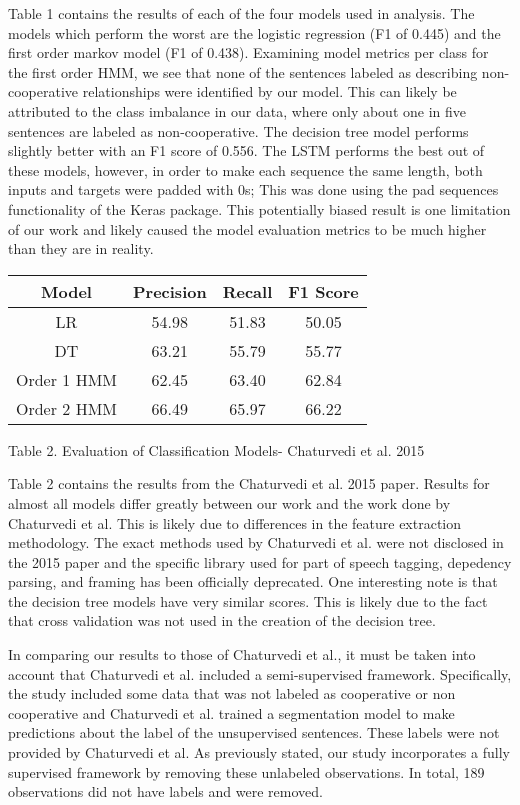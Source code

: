 \documentclass[11pt,a4paper]{article}
\begin{document}
Table 1 contains the results of each of the four models used in analysis. The models which perform the worst are the logistic regression (F1 of 0.445) and the first order markov model (F1 of 0.438). Examining model metrics per class for the first order HMM, we see that none of the sentences labeled as describing non-cooperative relationships were identified by our model. This can likely be attributed to the class imbalance in our data, where only about one in five sentences are labeled as non-cooperative. The decision tree model performs slightly better with an F1 score of 0.556. The LSTM performs the best out of these models, however, in order to make each sequence the same length, both inputs and targets were padded with 0s; This was done using the pad sequences functionality of the Keras package. This potentially biased result is one limitation of our work and likely caused the model evaluation metrics to be much higher than they are in reality. 

\begin{center}
 \begin{tabular}{||c c c c||} 
 \hline
 Model & Precision & Recall & F1 Score \\ [0.5ex] 
 \hline\hline
 LR & 54.98 & 51.83 & 50.05 \\ 
 \hline
 DT & 63.21 & 55.79 & 55.77 \\
 \hline
 Order 1 HMM & 62.45 & 63.40 & 62.84 \\
  \hline
 Order 2 HMM & 66.49 & 65.97 & 66.22 \\
 \hline
\end{tabular}
\end{center}
\caption{Table 2. Evaluation of Classification Models- Chaturvedi et al. 2015}
\label{table:2}


Table 2 contains the results from the Chaturvedi et al. 2015 paper. Results for almost all models differ greatly between our work and the work done by Chaturvedi et al. This is likely due to differences in the feature extraction methodology. The exact methods used by Chaturvedi et al. were not disclosed in the 2015 paper and the specific library used for part of speech tagging, depedency parsing, and framing has been officially deprecated. One interesting note is that the decision tree models have very similar scores. This is likely due to the fact that cross validation was not used in the creation of the decision tree. 

In comparing our results to those of Chaturvedi et al., it must be taken into account that Chaturvedi et al. included a semi-supervised framework. Specifically, the study included some data that was not labeled as cooperative or non cooperative and Chaturvedi et al. trained a segmentation model to make predictions about the label of the unsupervised sentences. These labels were not provided by Chaturvedi et al. As previously stated, our study incorporates a fully supervised framework by removing these unlabeled observations. In total, 189 observations did not have labels and were removed.
\end{document}
